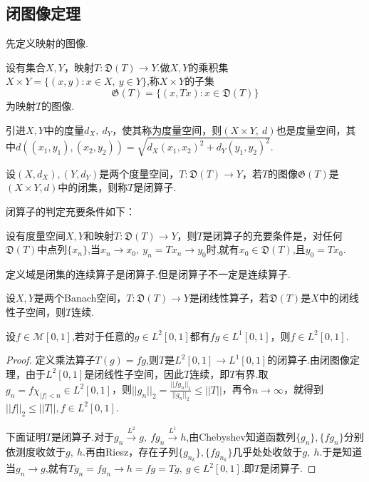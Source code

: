 \documentclass[lang=cn,10pt]{elegantbook}
\begin{document}
	\subsection{闭图像定理}
	先定义映射的图像.
	\begin{definition}[映射的图像]
		设有集合\(X,Y\)，映射\(T: \mathfrak{D}(T)\to Y\).做\(X,Y\)的乘积集\(X\times Y=\{(x,y):x\in X,\ y \in Y\}\),称\(X\times Y\)的子集
		\[\mathfrak{G}(T)=\{(x,Tx):x\in \mathfrak{D}(T)\}\]
		为映射\(T\)的图像.
	\end{definition}
	引进\(X,Y\)中的度量\(d_X,\ d_Y\)，使其称为度量空间，则\((X\times Y,\ d)\)也是度量空间，其中\(d((x_1,y_1),(x_2,y_2))=\sqrt{d_X(x_1,x_2)^2+d_Y(y_1,y_2)^2}.\)
	\begin{definition}[闭算子]
		设\((X,d_X),(Y,d_Y)\)是两个度量空间，\(T:\mathfrak{D}(T)\to Y\)，若\(T\)的图像\(\mathfrak{G}(T)\)是\((X\times Y,d)\)中的闭集，则称\(T\)是闭算子.
	\end{definition}
	闭算子的判定充要条件如下：
	\begin{lemma}
		设有度量空间\(X,Y\)和映射\(T:\mathfrak{D}(T)\to Y\)，则\(T\)是闭算子的充要条件是，对任何\(\mathfrak{D}(T)\)中点列\(\{x_n\}\),当\(x_n\to x_0,\ y_n=Tx_n\to y_0\)时,就有\(x_0\in \mathfrak{D}(T)\),且\(y_0=Tx_0\).
	\end{lemma}
	\begin{lemma}
		定义域是闭集的连续算子是闭算子.但是闭算子不一定是连续算子.
	\end{lemma}
	\begin{theorem}[闭图像定理(3.2.5)]
		设\(X,Y\)是两个Banach空间，\(T:\mathfrak{D}(T)\to Y\)是闭线性算子，若\(\mathfrak{D}(T)\)是\(X\)中的闭线性子空间，则\(T\)连续.
	\end{theorem}
	\begin{example}
		设\(f\in \mathcal{M}[0,1]\),若对于任意的\(g\in L^2[0,1]\)都有\(fg\in L^1[0,1]\)，则\(f\in L^2[0,1]\).
	\end{example}
	\begin{proof}
		定义乘法算子\(T(g)=fg\),则\(T\)是\(L^2[0,1]\to L^1[0,1]\)的闭算子.由闭图像定理，由于\(L^2[0,1]\)是闭线性子空间，因此\(T\)连续，即\(T\)有界.取\(g_n=f\chi_{|f|<n}\in L^2[0,1]\)，则\(||g_n||_2=\frac{||fg_n||_1}{||g_n||_2}\le ||T||\)，再令\(n\to \infty\)，就得到\(||f||_2\le||T||,f\in L^2[0,1]\).
		
		下面证明\(T\)是闭算子.对于\(g_n\xrightarrow{L^2}g,\ fg_n\xrightarrow{L^1}h\),由Chebyshev知道函数列\(\{g_n\},\{fg_n\}\)分别依测度收敛于\(g,\ h\).再由Riesz，存在子列\(\{g_{n_k}\},\{fg_{n_k}\}\)几乎处处收敛于\(g,\ h\).于是知道当\(g_n\to g\),就有\(Tg_n=fg_n\to h=fg=Tg,\ g\in L^2[0,1]\).即\(T\)是闭算子.
	\end{proof}
\end{document}
